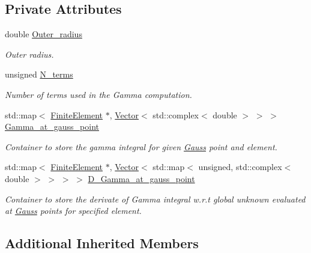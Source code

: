 \subsection*{Private Attributes}
\begin{DoxyCompactItemize}
\item 
double \hyperlink{classoomph_1_1FourierDecomposedHelmholtzDtNMesh_aafc92f60b7a64d97fd04e88e57889226}{Outer\+\_\+radius}
\begin{DoxyCompactList}\small\item\em Outer radius. \end{DoxyCompactList}\item 
unsigned \hyperlink{classoomph_1_1FourierDecomposedHelmholtzDtNMesh_a79e18c0ebbb532a4d95dfb2f1f3570ba}{N\+\_\+terms}
\begin{DoxyCompactList}\small\item\em Number of terms used in the Gamma computation. \end{DoxyCompactList}\item 
std\+::map$<$ \hyperlink{classoomph_1_1FiniteElement}{Finite\+Element} $\ast$, \hyperlink{classoomph_1_1Vector}{Vector}$<$ std\+::complex$<$ double $>$ $>$ $>$ \hyperlink{classoomph_1_1FourierDecomposedHelmholtzDtNMesh_a956867cfdb35fc5a714193bee55a54c4}{Gamma\+\_\+at\+\_\+gauss\+\_\+point}
\begin{DoxyCompactList}\small\item\em Container to store the gamma integral for given \hyperlink{classoomph_1_1Gauss}{Gauss} point and element. \end{DoxyCompactList}\item 
std\+::map$<$ \hyperlink{classoomph_1_1FiniteElement}{Finite\+Element} $\ast$, \hyperlink{classoomph_1_1Vector}{Vector}$<$ std\+::map$<$ unsigned, std\+::complex$<$ double $>$ $>$ $>$ $>$ \hyperlink{classoomph_1_1FourierDecomposedHelmholtzDtNMesh_a8a58410244815336ffacc1e33cbc0565}{D\+\_\+\+Gamma\+\_\+at\+\_\+gauss\+\_\+point}
\begin{DoxyCompactList}\small\item\em Container to store the derivate of Gamma integral w.\+r.\+t global unknown evaluated at \hyperlink{classoomph_1_1Gauss}{Gauss} points for specified element. \end{DoxyCompactList}\end{DoxyCompactItemize}
\subsection*{Additional Inherited Members}


